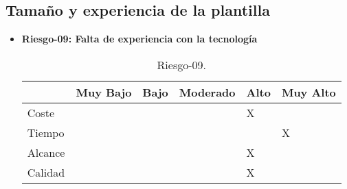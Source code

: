 \subsection{Tamaño y experiencia de la plantilla}
\begin{itemize}
	\item \textbf{Riesgo-09: Falta de experiencia con la tecnología}
	\begin{table}[H]
	\begin{center}
	\begin{tabular}{ l l l l l l }
	\hline
	& Muy Bajo & Bajo & Moderado & Alto & Muy Alto \\ \hline \hline
	Coste &  &  &  & X &  \\ \hline
	Tiempo &  &  &  &  & X \\ \hline
	Alcance &  &  &  & X &  \\ \hline
	Calidad &  &  &  & X &  \\ \hline
	\end{tabular}
	\caption{Riesgo-09.}
	\label{Riesgo-09}
	\end{center}
	\end{table}	
\end{itemize}